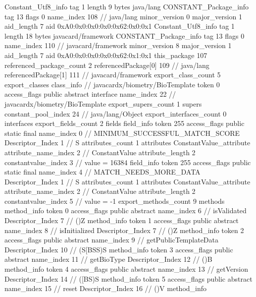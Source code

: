 {{{		}
		Constant_Utf8_info {
			tag	1
			length	9
			bytes	java/lang
		}
		CONSTANT_Package_info {
			tag	13
			flags	0
			name_index	108		// java/lang
			minor_version	0
			major_version	1
			aid_length	7
			aid	0xA0:0x0:0x0:0x0:0x62:0x0:0x1
		}
		Constant_Utf8_info {
			tag	1
			length	18
			bytes	javacard/framework
		}
		CONSTANT_Package_info {
			tag	13
			flags	0
			name_index	110		// javacard/framework
			minor_version	8
			major_version	1
			aid_length	7
			aid	0xA0:0x0:0x0:0x0:0x62:0x1:0x1
		}
	}
	this_package	107
	referenced_package_count	2
	referencedPackage[0]	109		// java/lang
	referencedPackage[1]	111		// javacard/framework
	export_class_count	5
	export_classes {
		class_info {		// javacardx/biometry/BioTemplate
			token	0
			access_flags	public abstract interface
			name_index	22		// javacardx/biometry/BioTemplate
			export_supers_count	1
			supers {
				constant_pool_index	24		// java/lang/Object
			}
			export_interfaces_count	0
			interfaces {
			}
			export_fields_count	2
			fields {
			field_info {
				token	255
				access_flags	public static final
				name_index	0		// MINIMUM_SUCCESSFUL_MATCH_SCORE
				Descriptor_Index	1		// S
				attributes_count	1
				attributes {
				ConstantValue_attribute {
					attribute_name_index	2		// ConstantValue
					attribute_length	2
					constantvalue_index	3		// value = 16384
				}
				}
			}
			field_info {
				token	255
				access_flags	public static final
				name_index	4		// MATCH_NEEDS_MORE_DATA
				Descriptor_Index	1		// S
				attributes_count	1
				attributes {
				ConstantValue_attribute {
					attribute_name_index	2		// ConstantValue
					attribute_length	2
					constantvalue_index	5		// value = -1
				}
				}
			}
			}
			export_methods_count	9
			methods {
				method_info {
					token	0
					access_flags	public abstract
					name_index	6		// isValidated
					Descriptor_Index	7		// ()Z
				}
				method_info {
					token	1
					access_flags	public abstract
					name_index	8		// isInitialized
					Descriptor_Index	7		// ()Z
				}
				method_info {
					token	2
					access_flags	public abstract
					name_index	9		// getPublicTemplateData
					Descriptor_Index	10		// (S[BSS)S
				}
				method_info {
					token	3
					access_flags	public abstract
					name_index	11		// getBioType
					Descriptor_Index	12		// ()B
				}
				method_info {
					token	4
					access_flags	public abstract
					name_index	13		// getVersion
					Descriptor_Index	14		// ([BS)S
				}
				method_info {
					token	5
					access_flags	public abstract
					name_index	15		// reset
					Descriptor_Index	16		// ()V
				}
				method_info {
}}}}}
